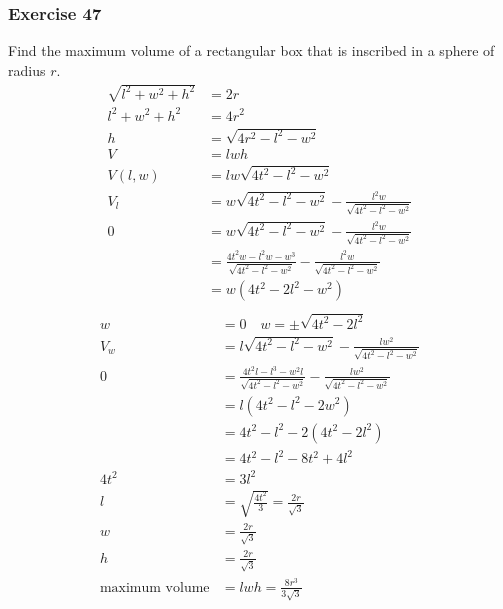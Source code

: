 \documentclass{math}
\begin{document}
\subsubsection*{Exercise 47}
Find the maximum volume of a rectangular box that is inscribed in a sphere of
radius \( r \).
\begin{align*}
  \sqrt{l^2+w^2+h^2} &= 2r \\
  l^2+w^2+h^2 &= 4r^2 \\
  h &= \sqrt{4r^2-l^2-w^2} \\
  V &= lwh \\
  V(l,w) &= lw\sqrt{4t^2-l^2-w^2} \\
  V_l &= w\sqrt{4t^2-l^2-w^2}-\frac{l^2w}{\sqrt{4t^2-l^2-w^2}} \\
  0 &= w\sqrt{4t^2-l^2-w^2}-\frac{l^2w}{\sqrt{4t^2-l^2-w^2}} \\
  &= \frac{4t^2w-l^2w-w^3}{\sqrt{4t^2-l^2-w^2}}-
    \frac{l^2w}{\sqrt{4t^2-l^2-w^2}} \\
  &= w(4t^2-2l^2-w^2) \\
\end{align*}
\begin{align*}
  w &= 0 \quad w = \pm\sqrt{4t^2-2l^2} \\
  V_w &= l\sqrt{4t^2-l^2-w^2}-\frac{lw^2}{\sqrt{4t^2-l^2-w^2}} \\
  0 &= \frac{4t^2l-l^3-w^2l}{\sqrt{4t^2-l^2-w^2}}
    -\frac{lw^2}{\sqrt{4t^2-l^2-w^2}} \\
  &= l(4t^2-l^2-2w^2) \\
  &= 4t^2-l^2-2(4t^2-2l^2) \\
  &= 4t^2-l^2-8t^2+4l^2 \\
  4t^2 &= 3l^2 \\
  l &= \sqrt{\frac{4t^2}{3}} = \frac{2r}{\sqrt{3}} \\
  w &= \frac{2r}{\sqrt{3}} \\
  h &= \frac{2r}{\sqrt{3}} \\
  \text{maximum volume} &= lwh = \frac{8r^3}{3\sqrt{3}}
\end{align*}
\end{document}
